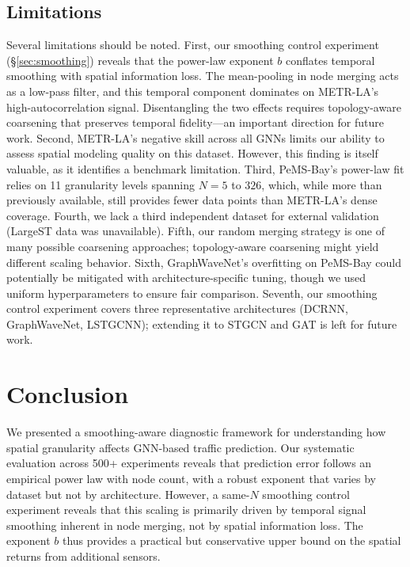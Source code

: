 \documentclass[letterpaper]{article}
\begin{document}
\subsection{Limitations}

Several limitations should be noted. First, our smoothing control experiment (\S\ref{sec:smoothing}) reveals that the power-law exponent $b$ conflates temporal smoothing with spatial information loss. The mean-pooling in node merging acts as a low-pass filter, and this temporal component dominates on METR-LA's high-autocorrelation signal. Disentangling the two effects requires topology-aware coarsening that preserves temporal fidelity---an important direction for future work. Second, METR-LA's negative skill across all GNNs limits our ability to assess spatial modeling quality on this dataset. However, this finding is itself valuable, as it identifies a benchmark limitation. Third, PeMS-Bay's power-law fit relies on 11 granularity levels spanning $N = 5$ to $326$, which, while more than previously available, still provides fewer data points than METR-LA's dense coverage. Fourth, we lack a third independent dataset for external validation (LargeST data was unavailable). Fifth, our random merging strategy is one of many possible coarsening approaches; topology-aware coarsening might yield different scaling behavior. Sixth, GraphWaveNet's overfitting on PeMS-Bay could potentially be mitigated with architecture-specific tuning, though we used uniform hyperparameters to ensure fair comparison. Seventh, our smoothing control experiment covers three representative architectures (DCRNN, GraphWaveNet, LSTGCNN); extending it to STGCN and GAT is left for future work.

\section{Conclusion}

We presented a smoothing-aware diagnostic framework for understanding how spatial granularity affects GNN-based traffic prediction. Our systematic evaluation across 500+ experiments reveals that prediction error follows an empirical power law with node count, with a robust exponent that varies by dataset but not by architecture. However, a same-$N$ smoothing control experiment reveals that this scaling is primarily driven by temporal signal smoothing inherent in node merging, not by spatial information loss. The exponent $b$ thus provides a practical but conservative upper bound on the spatial returns from additional sensors.
\end{document}
